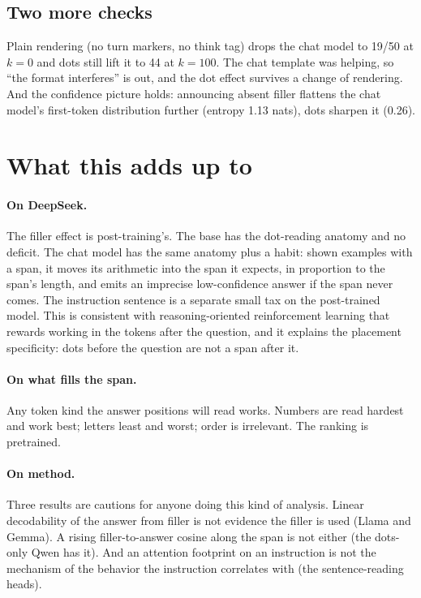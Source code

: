 \documentclass[11pt]{article}
\begin{document}
\subsection{Two more checks}

Plain rendering (no turn markers, no think tag) drops the chat model to 19/50 at $k=0$ and dots still lift it to 44 at $k=100$. The chat template was helping, so ``the format interferes'' is out, and the dot effect survives a change of rendering. And the confidence picture holds: announcing absent filler flattens the chat model's first-token distribution further (entropy 1.13 nats), dots sharpen it (0.26).

\section{What this adds up to}

\paragraph{On DeepSeek.} The filler effect is post-training's. The base has the dot-reading anatomy and no deficit. The chat model has the same anatomy plus a habit: shown examples with a span, it moves its arithmetic into the span it expects, in proportion to the span's length, and emits an imprecise low-confidence answer if the span never comes. The instruction sentence is a separate small tax on the post-trained model. This is consistent with reasoning-oriented reinforcement learning that rewards working in the tokens after the question, and it explains the placement specificity: dots before the question are not a span after it.

\paragraph{On what fills the span.} Any token kind the answer positions will read works. Numbers are read hardest and work best; letters least and worst; order is irrelevant. The ranking is pretrained.

\paragraph{On method.} Three results are cautions for anyone doing this kind of analysis. Linear decodability of the answer from filler is not evidence the filler is used (Llama and Gemma). A rising filler-to-answer cosine along the span is not either (the dots-only Qwen has it). And an attention footprint on an instruction is not the mechanism of the behavior the instruction correlates with (the sentence-reading heads).
\end{document}
